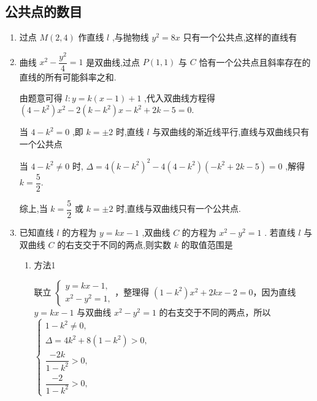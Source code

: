 \subsection*{公共点的数目}
\begin{enumerate}
    \item 过点 $M\left( {2,4}\right)$ 作直线 $l$ ,与抛物线 ${y}^{2} = {8x}$ 只有一个公共点,这样的直线有
    \item 曲线 ${x}^{2} - \dfrac{{y}^{2}}{4} = 1$ 是双曲线,过点 $P\left( {1,1}\right)$ 与 $C$ 恰有一个公共点且斜率存在的直线的所有可能斜率之和.
    \begin{jieda}
        由题意可得 $l : y = k\left( {x - 1}\right)  + 1$ ,代入双曲线方程得 $\left( {4 - {k}^{2}}\right) {x}^{2} - 2\left( {k - {k}^{2}}\right) x - {k}^{2} + {2k} - 5 = 0$.
        
        当 $4 - {k}^{2} = 0$ ,即 $k =  \pm  2$ 时,直线 $l$ 与双曲线的渐近线平行,直线与双曲线只有一个公共点

        当 $4 - {k}^{2} \neq  0$ 时, $\Delta  = 4{\left( k - {k}^{2}\right) }^{2} - 4\left( {4 - {k}^{2}}\right) \left( {-{k}^{2} + {2k} - 5}\right)  = 0$ ,解得 $k = \dfrac{5}{2}$.

        综上,当 $k = \dfrac{5}{2}$ 或 $k =  \pm  2$ 时,直线与双曲线只有一个公共点.
    \end{jieda}
    \item 已知直线 $l$ 的方程为 $y = {kx} - 1$ ,双曲线 $C$ 的方程为 ${x}^{2} - {y}^{2} = 1$ . 若直线 $l$ 与双曲线 $C$ 的右支交于不同的两点,则实数 $k$ 的取值范围是
    \begin{jieda}
        \begin{enumerate}
            \item 方法1 

            联立 $\left\{  \begin{array}{l} y = {kx} - 1, \\  {x}^{2} - {y}^{2} = 1, \end{array}\right.$，整理得 $\left( {1 - {k}^{2}}\right) {x}^{2} + {2kx} - 2 = 0$，因为直线 $y = {kx} - 1$ 与双曲线 ${x}^{2} - {y}^{2} = 1$ 的右支交于不同的两点，所以 $\left\{  \begin{array}{l} 1 - {k}^{2} \neq  0, \\  \Delta  = 4{k}^{2} + 8\left( {1 - {k}^{2}}\right)  > 0, \\  \dfrac{-{2k}}{1 - {k}^{2}} > 0, \\  \dfrac{-{2}}{1 - {k}^{2}} > 0, \end{array}\right.$
            

\end{enumerate}
\end{jieda}
\end{enumerate}
